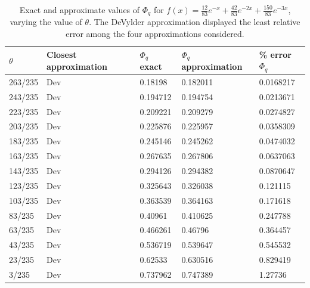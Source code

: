 \begin{table}[!h]
\begin{tabular}{|l|l|l|l|l|}
\hline
$\theta$ & Closest approximation & $\Phi_q$   exact & $\Phi_q$ approximation & \% error   $\Phi_q$ \\ \hline
263/235    & Dev                   & 0.18198        & 0.182011      & 0.0168217         \\ \hline
243/235    & Dev                   & 0.194712       & 0.194754      & 0.0213671         \\ \hline
223/235    & Dev                   & 0.209221       & 0.209279      & 0.0274827         \\ \hline
203/235    & Dev                   & 0.225876       & 0.225957      & 0.0358309         \\ \hline
183/235    & Dev                   & 0.245146       & 0.245262      & 0.0474032         \\ \hline
163/235    & Dev                   & 0.267635       & 0.267806      & 0.0637063         \\ \hline
143/235    & Dev                   & 0.294126       & 0.294382      & 0.0870647         \\ \hline
123/235    & Dev                   & 0.325643       & 0.326038      & 0.121115          \\ \hline
103/235    & Dev                   & 0.363539       & 0.364163      & 0.171618          \\ \hline
83/235     & Dev                   & 0.40961        & 0.410625      & 0.247788          \\ \hline
63/235     & Dev                   & 0.466261       & 0.46796       & 0.364457          \\ \hline
43/235     & Dev                   & 0.536719       & 0.539647      & 0.545532          \\ \hline
23/235     & Dev                   & 0.62533        & 0.630516      & 0.829419          \\ \hline
3/235      & Dev                   & 0.737962       & 0.747389      & 1.27736           \\ \hline
\end{tabular}
\caption{Exact and approximate values of $\Phi_q$ for $f(x)=\frac{12}{83 }e^{-x}+\frac{42}{83} e^{-2 x}+\frac{150}{83}e^{-3x}$, varying the value of $\theta$. The DeVylder approximation displayed the least relative error  among the four approximations considered.}
\label{table:MixExp83Phiq}
\end{table}

